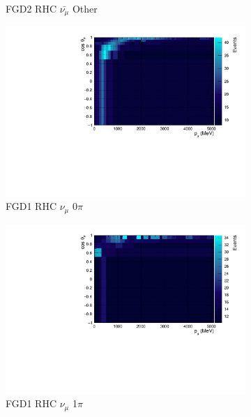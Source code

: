 \begin{figure}[!htbp]
\begin{subfigure}{.32\textwidth}
  \caption{FGD2 RHC $\bar{\nu_{\mu}}$ Other}
  \label{fig:th2polynomFGD2_anti-numuCC_other}
\end{subfigure}
\begin{subfigure}{.32\textwidth}
  \centering
  \includegraphics[width=0.95\linewidth]{figs/TH2PolyNom_MC_FGD1_NuMuBkg_CC0pi_in_AntiNu_Mode}
  \caption{FGD1 RHC $\nu_{\mu}$ 0$\pi$}
  \label{fig:th2polynomFGD1_NuMuBkg_CC0pi_in_AntiNu_Mode}
\end{subfigure}
\begin{subfigure}{.32\textwidth}
  \centering
  \includegraphics[width=0.95\linewidth]{figs/TH2PolyNom_MC_FGD1_NuMuBkg_CC1pi_in_AntiNu_Mode}
  \caption{FGD1 RHC $\nu_{\mu}$ 1$\pi$}
  \label{fig:th2polynomFGD1_NuMuBkg_CC1pi_in_AntiNu_Mode}
\end{subfigure}
\begin{subfigure}{.32\textwidth}
  \centering

\end{subfigure}
\end{figure}

